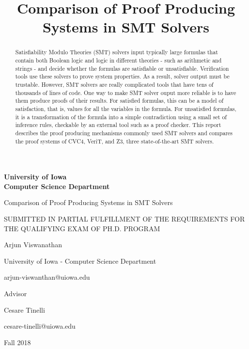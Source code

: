 \documentclass{article}
\begin{document}
\begin{titlepage}
	\centering
	{\textbf{\Large University of Iowa \\ Computer Science Department}}
	\vspace{1cm}
	
	{\Huge Comparison of Proof Producing Systems in SMT Solvers \par}
	\vspace{1cm}
	
	{\large SUBMITTED IN PARTIAL FULFILLMENT OF THE REQUIREMENTS 
		FOR THE QUALIFYING EXAM OF PH.D. PROGRAM \par}
	\vspace{2cm}
	
	{\Large Arjun Viswanathan \par}
	{\large University of Iowa - Computer Science Department \par}
	{\large arjun-viswanthan@uiowa.edu}
	\vspace{2cm}
	
	{\large Advisor \par}
	{\Large Cesare Tinelli \par}
	{\large cesare-tinelli@uiowa.edu \par}
	
	\vfill
	{\large Fall 2018}
\end{titlepage}

\title{Comparison of Proof Producing Systems in SMT Solvers}
\date{}
\maketitle
\begin{abstract}
Satisfiability Modulo Theories (SMT) solvers input typically
large formulas that contain both Boolean logic and logic in 
different theories - such as arithmetic and strings - and 
decide whether 
the formulas are satisfiable or unsatisfiable. Verification 
tools use these solvers to prove system properties. As a 
result, solver output must be trustable. However, SMT solvers 
are really complicated tools that have tens of thousands of 
lines of code. One way to make SMT solver ouput more reliable is 
to have them produce proofs of their results. 
For satisfied formulas, this can be a model of 
satisfaction, that is, values for all the variables in the
formula. For unsatisfied formulas, it is a transformation of 
the formula into a simple contradiction using a small set of 
inference rules, checkable by an external tool such as a proof 
checker. This report describes the proof producing mechanisms 
commonly used SMT solvers and compares the proof systems 
of CVC4, VeriT, and Z3, three state-of-the-art SMT solvers.
\end{abstract}
\end{document}
